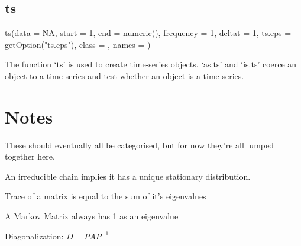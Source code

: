 \documentclass[12pt]{article}
\begin{document}
\subsection{ts}
	ts(data = NA, start = 1, end = numeric(), frequency = 1, deltat = 1, ts.eps = getOption("ts.eps"), class = , names = )

	The function ‘ts’ is used to create time-series objects.
	‘as.ts’ and ‘is.ts’ coerce an object to a time-series and test
	whether an object is a time series.

\section{Notes}
    These should eventually all be categorised, but for now they're all lumped together here.

    An irreducible chain implies it has a unique stationary distribution.

    Trace of a matrix is equal to the sum of it's eigenvalues

    A Markov Matrix always has 1 as an eigenvalue

    Diagonalization: \(D = PAP^{-1}\)
\end{document}
